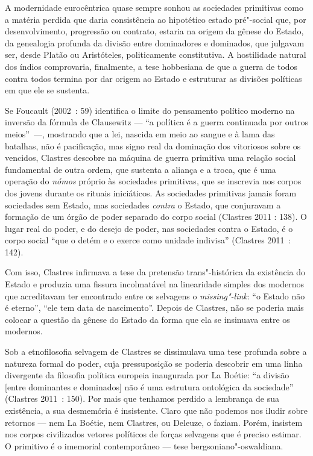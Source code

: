A modernidade eurocêntrica quase sempre sonhou as sociedades primitivas
como a matéria perdida que daria consistência ao hipotético estado
pré"-social que, por desenvolvimento, progressão ou contrato, estaria na
origem da gênese do Estado, da genealogia profunda da divisão entre
dominadores e dominados, que julgavam ser, desde Platão ou Aristóteles,
politicamente constitutiva. A hostilidade natural dos índios
comprovaria, finalmente, a tese hobbesiana de que a guerra de todos
contra todos termina por dar origem ao Estado e estruturar as divisões
políticas em que ele se sustenta.

Se Foucault (2002~: 59) identifica o limite do pensamento político
moderno na inversão da fórmula de Clausewitz --- ``a política é a guerra
continuada por outros meios''~---, mostrando que a lei, nascida em meio
ao sangue e à lama das batalhas, não é pacificação, mas signo real da
dominação dos vitoriosos sobre os vencidos, Clastres descobre na máquina
de guerra primitiva uma relação social fundamental de outra ordem, que
sustenta a aliança e a troca, que é uma operação do \emph{nómos }próprio
às sociedades primitivas, que se inscrevia nos corpos dos jovens durante
os rituais iniciáticos. As sociedades primitivas jamais foram sociedades
sem Estado, mas sociedades \emph{contra }o Estado, que conjuravam a
formação de um órgão de poder separado do corpo social (Clastres 2011 :
138). O lugar real do poder, e do desejo de poder, nas sociedades contra
o Estado, é o corpo social ``que o detém e o exerce como unidade
indivisa'' (Clastres 2011~: 142).

Com isso, Clastres infirmava a tese da pretensão trans"-histórica da
existência do Estado e produzia uma fissura incolmatável na linearidade
simples dos modernos que acreditavam ter encontrado entre os selvagens o
\emph{missing"-link}: ``o Estado não é eterno'', ``ele tem data de
nascimento''. Depois de Clastres, não se poderia mais colocar a questão
da gênese do Estado da forma que ela se insinuava entre os modernos.

Sob a etnofilosofia selvagem de Clastres se dissimulava uma tese
profunda sobre a natureza formal do poder, cuja pressuposição se poderia
descobrir em uma linha divergente da filosofia política europeia
inaugurada por La Boétie: ``a divisão {[}entre dominantes e dominados{]}
não é uma estrutura ontológica da sociedade'' (Clastres 2011~: 150). Por
mais que tenhamos perdido a lembrança de sua existência, a sua
desmemória é insistente. Claro que não podemos nos iludir sobre retornos
--- nem La Boétie, nem Clastres, ou Deleuze, o faziam. Porém, insistem
nos corpos civilizados vetores políticos de forças selvagens que é
preciso estimar. O primitivo é o imemorial contemporâneo --- tese
bergsoniano"-oswaldiana.

